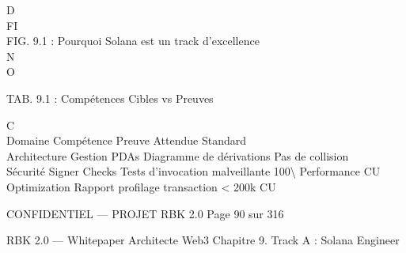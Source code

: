 \vspace{0.5em}
\vspace{0.5em}
D\\
FI\\
FIG. 9.1 : Pourquoi Solana est un track d’excellence\\
N\\
O\\
\begin{center}\begin{tabular}TAB. 9.1 : Compétences Cibles vs Preuves\end{tabular}\end{center}
C\\
\vspace{0.5em}
\vspace{0.5em}
Domaine      Compétence     Preuve Attendue                 Standard\\
Architecture Gestion PDAs   Diagramme de dérivations        Pas de collision\\
Sécurité     Signer Checks  Tests d’invocation malveillante 100\textbackslash{}%
Performance CU Optimization Rapport profilage transaction \textless{} 200k CU\\
\vspace{0.5em}
\vspace{0.5em}
\vspace{0.5em}
\vspace{0.5em}
\begin{confidential}CONFIDENTIEL — PROJET RBK 2.0                                   Page 90 sur 316\end{confidential}
RBK 2.0 — Whitepaper Architecte Web3                                                                 Chapitre 9. Track A : Solana Engineer\\
\vspace{0.5em}
\vspace{0.5em}
\vspace{0.5em}
